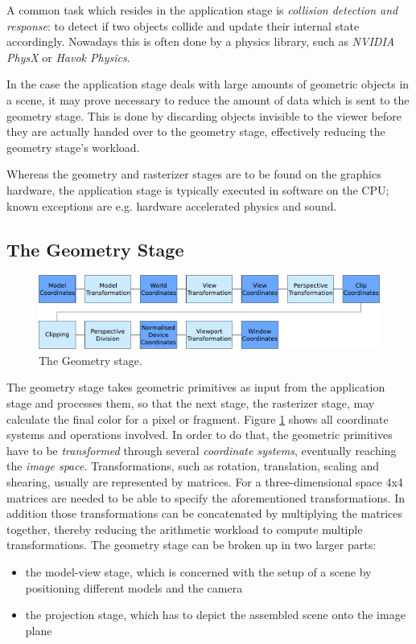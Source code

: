 A common task which resides in the application stage is \textit{collision
detection and response}: to detect if two objects collide and update their
internal state accordingly. Nowadays this is often done by a physics library,
such as \textit{NVIDIA PhysX}\cite{misc:ageia-physx} or \textit{Havok
Physics}\cite{misc:havok}.

In the case the application stage deals with large amounts of geometric
objects in a scene, it may prove necessary to reduce the amount of data which
is sent to the geometry stage. This is done by discarding objects invisible to
the viewer before they are actually handed over to the geometry stage,
effectively reducing the geometry stage's workload.

Whereas the geometry and rasterizer stages are to be found on the graphics
hardware, the application stage is typically executed in software on the CPU;
known exceptions are e.g. hardware accelerated physics and sound.

\subsection{The Geometry Stage}

\begin{figure}
\begin{center}
\includegraphics[scale=0.5]{Images/Geometry-Stage.pdf}
\caption{The Geometry stage.}
\label{fig:GeometryStage}
\end{center}
\end{figure}

The geometry stage takes geometric primitives as input from the application
stage and processes them, so that the next stage, the rasterizer stage, may
calculate the final color for a pixel or fragment. Figure
\ref{fig:GeometryStage} shows all coordinate systems and operations involved. In
order to do that, the geometric primitives have to be \textit{transformed}
through several \textit{coordinate systems}, eventually reaching the
\textit{image space}. Transformations, such as rotation, translation,
scaling and shearing, usually are represented by matrices. For a
three-dimensional space 4x4 matrices are needed to be able to specify the
aforementioned transformations. In addition those transformations can be
concatenated by multiplying the matrices together, thereby reducing the
arithmetic workload to compute multiple transformations.
The geometry stage can be broken up in two larger parts:
\begin{itemize}
 \item  the model-view stage, which is concerned with the setup of a scene by
positioning different models and the camera
 \item the projection stage, which has to depict the assembled scene onto the
image plane
\end{itemize}

